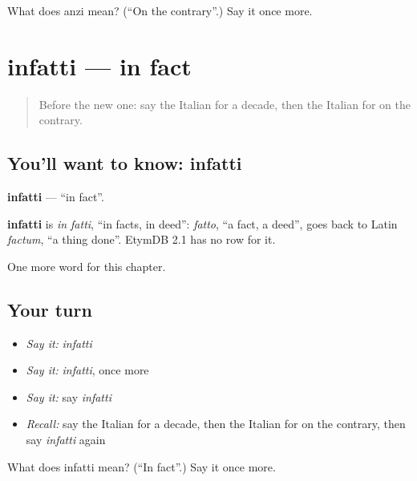 \begin{tcolorbox}[breakable,colback=teal!4,colframe=teal!35!black,title={Before you move on}]
What does anzi mean? (\textquotedblleft{}On the contrary\textquotedblright{}.) Say it once more.
\end{tcolorbox}
\section[infatti]{infatti — in fact}

\label{lesson:IT-C188-infatti}



\begin{quote}
Before the new one: say the Italian for a decade, then the Italian for on the contrary.
\end{quote}

\subsection*{You'll want to know: infatti}
\textbf{infatti} — \textquotedblleft{}in fact\textquotedblright{}.

\begin{cousinweb}
\textbf{infatti} is \emph{in fatti}, \textquotedblleft{}in facts, in deed\textquotedblright{}: \emph{fatto}, \textquotedblleft{}a fact, a deed\textquotedblright{}, goes back to Latin \emph{factum}, \textquotedblleft{}a thing done\textquotedblright{}. EtymDB 2.1 has no row for it.
\end{cousinweb}

\begin{grammarlens}[title={What you've built}]
One more word for this chapter.
\end{grammarlens}

\subsection*{Your turn}
\begin{itemize}
\raggedright
  \item \emph{Say it:} \emph{infatti}
  \item \emph{Say it:} \emph{infatti}, once more
  \item \emph{Say it:} say \emph{infatti}
  \item \emph{Recall:} say the Italian for a decade, then the Italian for on the contrary, then say \emph{infatti} again
\end{itemize}

\begin{tcolorbox}[breakable,colback=teal!4,colframe=teal!35!black,title={Before you move on}]
What does infatti mean? (\textquotedblleft{}In fact\textquotedblright{}.) Say it once more.
\end{tcolorbox}
